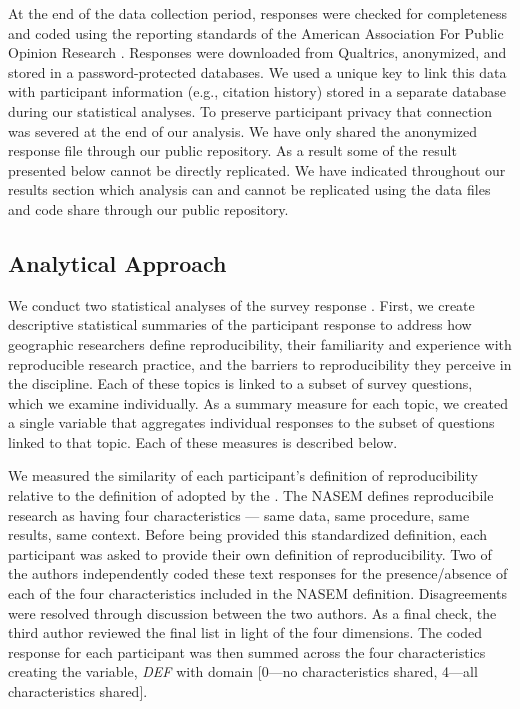 \documentclass[]{interact}
\theoremstyle{plain}%
\theoremstyle{definition}
\theoremstyle{remark}
\begin{document}
At the end of the data collection period, responses were checked for completeness and coded using the reporting standards of the American Association For Public Opinion Research \citep{aaporstandards}.
Responses were downloaded from Qualtrics, anonymized, and stored in a password-protected databases.
We used a unique key to link this data with participant information (e.g., citation history) stored in a separate database during our statistical analyses. 
To preserve participant privacy that connection was severed at the end of our analysis.
We have only shared the anonymized response file through our public repository. 
As a result some of the result presented below cannot be directly replicated. 
We have indicated throughout our results section which analysis can and cannot be replicated using the data files and code share through our public repository. 

\subsection*{Analytical Approach}
We conduct two statistical analyses of the survey response
.
First, we create descriptive statistical summaries of the participant response to address how geographic researchers define reproducibility, their familiarity and experience with reproducible research practice, and the barriers to reproducibility they perceive in the discipline.
Each of these topics is linked to a subset of survey questions, which we examine individually.
As a summary measure for each topic, we created a single variable that aggregates individual responses to the subset of questions linked to that topic.
Each of these measures is described below.

We measured the similarity of each participant's definition of reproducibility relative to the definition of adopted by the \citet{NASEM2019}. 
The NASEM defines reproducibile research as having four characteristics --- same data, same procedure, same results, same context.
Before being provided this standardized definition, each participant was asked to provide their own definition of reproducibility.
Two of the authors independently coded these text responses for the presence/absence of each of the four characteristics included in the NASEM definition.
Disagreements were resolved through discussion between the two authors. 
As a final check, the third author reviewed the final list in light of the four dimensions.
The coded response for each participant was then summed across the four characteristics creating the variable, \textit{DEF} with domain [0---no characteristics shared, 4---all characteristics shared].
\end{document}
